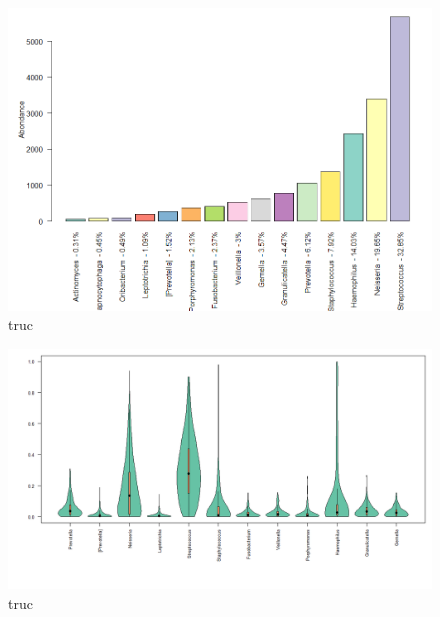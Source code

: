 \documentclass[12pt,a4paper]{article}
\begin{document}
\begin{figure}[!h]
\begin{center}
\includegraphics[scale=0.5]{img/core.png}\hfill
\end{center}
\caption{truc}
\label{core}
\end{figure}




\begin{figure}[!h]
\begin{center}
\includegraphics[scale=0.5]{img/variability.png}\hfill
\end{center}
\caption{truc}
\label{violon}
\end{figure}
\end{document}
